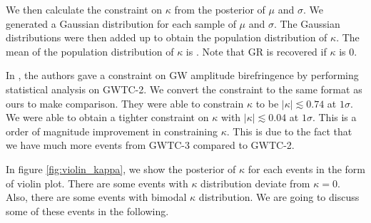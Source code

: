 \documentclass[aps,prd,twocolumn,superscriptaddress,preprintnumbers,floatfix,nofootinbib]{revtex4-2}
\begin{document}

We then calculate the constraint on $\kappa$ from the posterior of $\mu$ and $\sigma$.
We generated a Gaussian distribution for each sample of $\mu$ and $\sigma$.
The Gaussian distributions were then added up to obtain the population distribution of $\kappa$.
The mean of the population distribution of $\kappa$ is .
Note that GR is recovered if $\kappa$ is $0$.

In \citet{Okounkova_2022}, the authors gave a constraint on GW amplitude birefringence by performing statistical analysis on GWTC-2.
We convert the constraint to the same format as ours to make comparison.
They were able to constrain $\kappa$ to be $|\kappa| \lesssim 0.74$ at $1 \sigma$.
We were able to obtain a tighter constraint on $\kappa$ with $|\kappa| \lesssim 0.04$ at $1 \sigma$.
This is a order of magnitude improvement in constraining $\kappa$.
This is due to the fact that we have much more events from GWTC-3 compared to GWTC-2.

In figure \ref{fig:violin_kappa}, we show the posterior of $\kappa$ for each events in the form of violin plot.
There are some events with $\kappa$ distribution deviate from $\kappa=0$.
Also, there are some events with bimodal $\kappa$ distribution.
We are going to discuss some of these events in the following.

\end{document}
